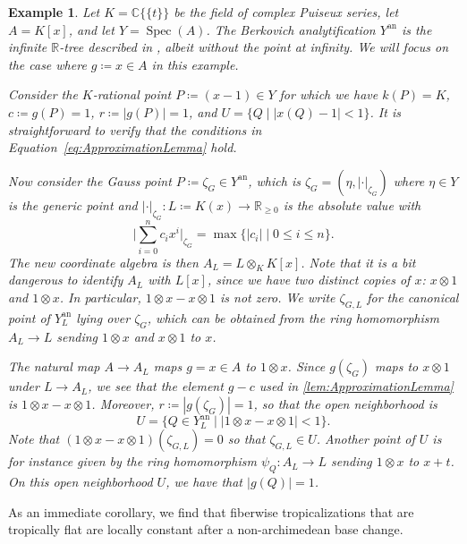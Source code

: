 \documentclass[12pt,reqno,a4paper]{amsart}
\theoremstyle{theoremstyle}
\theoremstyle{examplestyle}
\newtheorem{example}[theorem]{Example}
\theoremstyle{algorithmstyle}
\newcommand{\RR}{\mathbb{R}}
\newcommand{\an}{{\mathrm{an}}}
\DeclareMathOperator{\Spec}{Spec}
\begin{document}
\begin{example}\label{exa:LocalConstancy}
  Let $K=\mathbb{C}\{\!\{t\}\!\}$ be the field of complex Puiseux series, let $A=K[x]$, and let $Y=\Spec(A)$. The Berkovich analytification $Y^{\an}$ is the infinite $\RR$-tree described in \cite[Section 2.1]{BakerRumely2010}, albeit without the point at infinity.  We will focus on the case where $g\coloneqq x\in A$ in this example.

  Consider the $K$-rational point $P\coloneqq (x-1)\in Y$ for which we have $k(P)=K$, $c\coloneqq g(P)=1$, $r\coloneqq |g(P)|=1$, and $U=\{Q\mid |x(Q)-1|<1\}$.  It is straightforward to verify that the conditions in Equation~\eqref{eq:ApproximationLemma} hold.

  Now consider the \emph{Gauss point} $P\coloneqq \zeta_{G}\in Y^\an$, which is $\zeta_G=(\eta,|\cdot |_{\zeta_G})$ where $\eta\in Y$ is the generic point and $|\cdot|_{\zeta_G}\colon L\coloneqq K(x)\rightarrow \RR_{\geq0}$ is the absolute value with
  \begin{equation*}
    \Big|\sum_{i=0}^{n}c_{i}x^{i}\Big|_{\zeta_{G}}=\max\Big\{|c_{i}|\mid 0\leq{i}\leq{n}\Big\}.
  \end{equation*}
%
%
The new coordinate algebra is then $A_{L}=L\otimes_{K}K[x]$. Note that it is a bit dangerous to identify $A_L$ with $L[x]$, since we have two distinct copies of $x$: $x\otimes 1$ and $1\otimes x$. In particular,  $1\otimes x-x\otimes 1$ is not zero. We write $\zeta_{G,L}$ for the canonical point of $Y^{\an}_{L}$ lying over $\zeta_{G}$, which can be obtained from the ring homomorphism $A_{L}\to L$ sending $1\otimes x$ and $x\otimes 1$ to $x$.

  The natural map $A\to A_{L}$ maps $g=x\in A$ to $1\otimes x$. Since $g(\zeta_{G})$ maps to $x\otimes 1$ under $L\to A_{L}$, we see that the element $g-c$ used in \cref{lem:ApproximationLemma} is $1\otimes x-x\otimes 1$. Moreover, $r\coloneqq |g(\zeta_{G})|=1$, so that the open neighborhood is %
  \begin{equation*}
    U=\Big\{Q\in Y^{\an}_{L}\mid |1\otimes x-x\otimes 1|<1\Big\}.
  \end{equation*}
  Note that $(1\otimes x-x\otimes 1)(\zeta_{G,L})=0$ so that $\zeta_{G,L}\in U$. Another point of $U$ is for instance given by the ring homomorphism $\psi_{Q}:A_{L}\to L$ sending $1\otimes x$ to $x+t$. On this open neighborhood $U$, we have that $|g(Q)|=1$. %

\end{example}

As an immediate corollary, we find that fiberwise tropicalizations that are tropically flat are locally constant after a non-archimedean base change.
\end{document}
